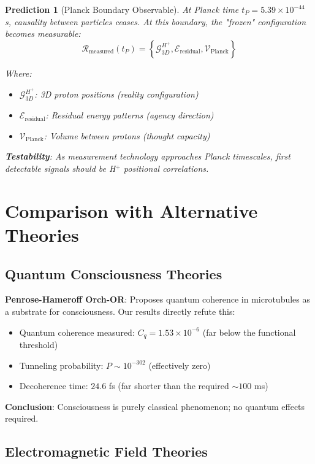 \documentclass[12pt,a4paper]{article}
\newtheorem{prediction}[theorem]{Prediction}
\begin{document}
\begin{prediction}[Planck Boundary Observable]
At Planck time $t_P = 5.39 \times 10^{-44}$ s, causality between particles ceases. At this boundary, the "frozen" configuration becomes measurable:
\begin{equation}
\mathcal{R}_{\text{measured}}(t_P) = \left\{\mathcal{G}_{3D}^{H^+}, \mathcal{E}_{\text{residual}}, \mathcal{V}_{\text{Planck}}\right\}
\end{equation}

Where:
\begin{itemize}
\item $\mathcal{G}_{3D}^{H^+}$: 3D proton positions (reality configuration)
\item $\mathcal{E}_{\text{residual}}$: Residual energy patterns (agency direction)
\item $\mathcal{V}_{\text{Planck}}$: Volume between protons (thought capacity)
\end{itemize}

\textbf{Testability}: As measurement technology approaches Planck timescales, first detectable signals should be H$^+$ positional correlations.
\end{prediction}

\section{Comparison with Alternative Theories}

\subsection{Quantum Consciousness Theories}

\textbf{Penrose-Hameroff Orch-OR}: Proposes quantum coherence in microtubules as a substrate for consciousness. Our results directly refute this:
\begin{itemize}
\item Quantum coherence measured: $C_q = 1.53 \times 10^{-6}$ (far below the functional threshold)
\item Tunneling probability: $P \sim 10^{-302}$ (effectively zero)
\item Decoherence time: $24.6$ fs (far shorter than the required $\sim 100$ ms)
\end{itemize}

\textbf{Conclusion}: Consciousness is purely classical phenomenon; no quantum effects required.

\subsection{Electromagnetic Field Theories}
\end{document}
